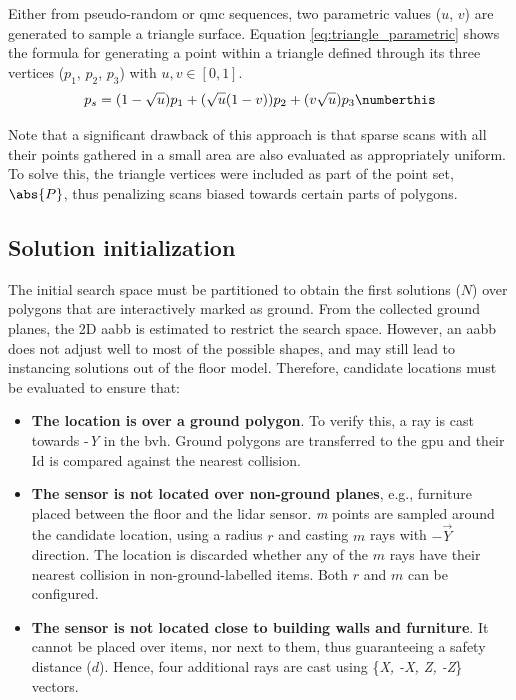 Either from pseudo-random or \acrshort{qmc} sequences, two parametric values ($u$, $v$) are generated to sample a triangle surface. Equation \ref{eq:triangle_parametric} shows the formula for generating a point within a triangle defined through its three vertices ($p_1$, $p_2$, $p_3$) with $u, v \in [0, 1]$. 
\begin{align*}
    p_{s} = (1 - \sqrt{u}) p_1 + (\sqrt{u} (1 - v)) p_2 + (v \sqrt{u}) p_3
    \numberthis \label{eq:triangle_parametric}
\end{align*}

Note that a significant drawback of this approach is that sparse scans with all their points gathered in a small area are also evaluated as appropriately uniform. To solve this, the triangle vertices were included as part of the point set, $\abs{P}$, thus penalizing scans biased towards certain parts of polygons.

\subsection{Solution initialization}

The initial search space must be partitioned to obtain the first solutions ($N$) over polygons that are interactively marked as ground. From the collected ground planes, the 2D \acrshort{aabb} is estimated to restrict the search space. However, an \acrshort{aabb} does not adjust well to most of the possible shapes, and may still lead to instancing solutions out of the floor model. Therefore, candidate locations must be evaluated to ensure that:
\begin{itemize}
  \item \textbf{The location is over a ground polygon}. To verify this, a ray is cast towards -\textit{Y} in the \acrshort{bvh}. Ground polygons are transferred to the \acrshort{gpu} and their Id is compared against the nearest collision.
  \item \textbf{The sensor is not located over non-ground planes}, e.g., furniture placed between the floor and the \acrshort{lidar} sensor. \textit{m} points are sampled around the candidate location, using a radius $r$ and casting $m$ rays with $-\vec{Y}$ direction. The location is discarded whether any of the $m$ rays have their nearest collision in non-ground-labelled items. Both $r$ and $m$ can be configured.
  \item \textbf{The sensor is not located close to building walls and furniture}. It cannot be placed over items, nor next to them, thus guaranteeing a safety distance ($d$). Hence, four additional rays are cast using \{\textit{X, -X, Z, -Z}\} vectors.
\end{itemize}


